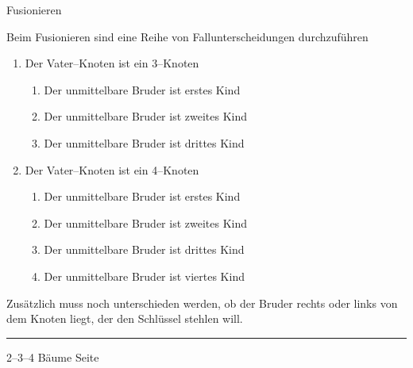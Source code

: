 \begin{slide}{}
\normalsize

\begin{center}
Fusionieren
\end{center}
\vspace*{0.5cm}

\footnotesize
Beim Fusionieren sind eine Reihe von Fallunterscheidungen
durchzuf\"uhren
\begin{enumerate}
\item Der Vater--Knoten ist ein 3--Knoten
      \begin{enumerate}
      \item Der unmittelbare Bruder ist erstes Kind
      \item Der unmittelbare Bruder ist zweites Kind
      \item Der unmittelbare Bruder ist drittes Kind
      \end{enumerate}
\item Der Vater--Knoten ist ein 4--Knoten
      \begin{enumerate}
      \item Der unmittelbare Bruder ist erstes Kind
      \item Der unmittelbare Bruder ist zweites Kind
      \item Der unmittelbare Bruder ist drittes Kind
      \item Der unmittelbare Bruder ist viertes Kind
    \end{enumerate}
\end{enumerate}
Zus\"atzlich muss noch unterschieden werden, ob der Bruder rechts oder links
von dem Knoten liegt, der den Schl\"ussel stehlen will.

\begin{center}
\end{center}


\vspace*{\fill}
\tiny \addtocounter{mypage}{1}
\rule{17cm}{1mm}
2--3--4 B\"aume  \hspace*{\fill} Seite 
\end{slide}


